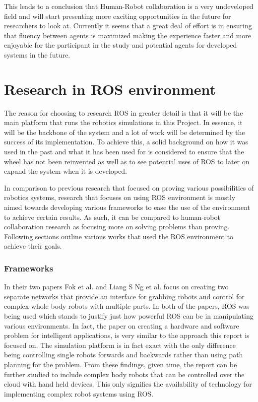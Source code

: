         This leads to a conclusion that Human-Robot collaboration is a very undeveloped field and will start presenting more exciting opportunities in the future for researchers to look at. Currently it seems that a great deal of effort is in ensuring that fluency between agents is maximized making the experience faster and more enjoyable for the participant in the study and potential agents for developed systems in the future.
    
    \section{Research in ROS environment}
        The reason for choosing to research ROS in greater detail is that it will be the main platform that runs the robotics simulations in this Project. In essence, it will be the backbone of the system and a lot of work will be determined by the success of its implementation. To achieve this, a solid background on how it was used in the past and what it has been used for is considered to ensure that the wheel has not been reinvented as well as to see potential uses of ROS to later on expand the system when it is developed.

        In comparison to previous research that focused on proving various possibilities of robotics systems, research that focuses on using ROS environment is mostly aimed towards developing various frameworks to ease the use of the environment to achieve certain results. As such, it can be compared to human-robot collaboration research as focusing more on solving problems than proving. Following sections outline various works that used the ROS environment to achieve their goals.

      \subsubsection{Frameworks}
        In their two papers Fok et al.\cite{ChienLiang} and Liang S Ng et al.\cite{Liang} focus on creating two separate networks that provide an interface for grabbing robots and control for complex whole body robots with multiple parts. In both of the papers, ROS was being used which stands to justify just how powerful ROS can be in manipulating various environments. In fact, the paper on creating a hardware and software problem for intelligent applications, is very similar to the approach this report is focused on. The simulation platform is in fact exact with the only difference being controlling single robots forwards and backwards rather than using path planning for the problem. From these findings, given time, the report can be further studied to include complex body robots that can be controlled over the cloud with hand held devices. This only signifies the availability of technology for implementing complex robot systems using ROS.

